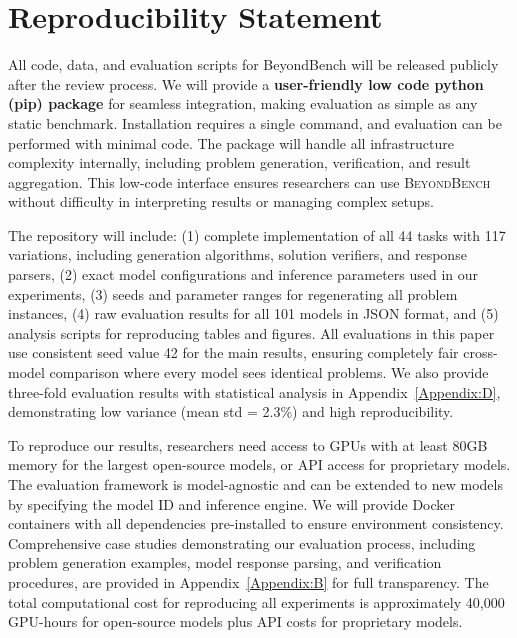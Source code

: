 \documentclass{article} %
\theoremstyle{plain}
\theoremstyle{definition}
\newcommand{\our}{\textsc{BeyondBench}\xspace}
\newcommand{\rebuttal}[1]{{\color{RebuttalGreen}#1}}
\begin{document}
\section*{Reproducibility Statement}

\rebuttal{All code, data, and evaluation scripts for BeyondBench will be released publicly after the review process. We will provide a \textbf{user-friendly low code python (pip) package} for seamless integration, making evaluation as simple as any static benchmark. Installation requires a single command, and evaluation can be performed with minimal code.} \rebuttal{The package will handle all infrastructure complexity internally, including problem generation, verification, and result aggregation. This low-code interface ensures researchers can use \our without difficulty in interpreting results or managing complex setups.}

The repository will include: (1) complete implementation of all 44 tasks with 117 variations, including generation algorithms, solution verifiers, and response parsers, (2) exact model configurations and inference parameters used in our experiments, (3) seeds and parameter ranges for regenerating all problem instances, (4) raw evaluation results for all 101 models in JSON format, and (5) analysis scripts for reproducing tables and figures. \rebuttal{All evaluations in this paper use consistent seed value 42 for the main results, ensuring completely fair cross-model comparison where every model sees identical problems. We also provide three-fold evaluation results with statistical analysis in Appendix~\ref{Appendix:D}, demonstrating low variance (mean std = 2.3\%) and high reproducibility.}

To reproduce our results, researchers need access to GPUs with at least 80GB memory for the largest open-source models, or API access for proprietary models. The evaluation framework is model-agnostic and can be extended to new models by specifying the model ID and inference engine. We will provide Docker containers with all dependencies pre-installed to ensure environment consistency. \rebuttal{Comprehensive case studies demonstrating our evaluation process, including problem generation examples, model response parsing, and verification procedures, are provided in Appendix~\ref{Appendix:B} for full transparency.} The total computational cost for reproducing all experiments is approximately 40,000 GPU-hours for open-source models plus API costs for proprietary models.





\clearpage
\appendix


\end{document}
